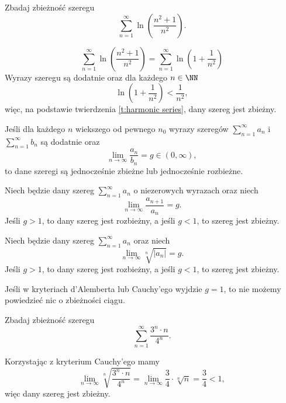 \begin{example}
    Zbadaj zbieżność szeregu
    \[ \sum_{n=1}^\infty \ln\left(\frac{n^2 + 1}{n^2}\right). \]
\end{example}
\begin{solution}
    \[ \sum_{n=1}^\infty \ln\left(\frac{n^2 + 1}{n^2}\right) = \sum_{n=1}^\infty \ln\left(1 + \frac{1}{n^2}\right) \]
    Wyrazy szeregu są dodatnie oraz dla każdego $n \in \NN$
    \[ \ln\left(1 + \frac{1}{n^2}\right)  < \frac{1}{n^2}, \]
    więc, na podstawie twierdzenia \ref{t:harmonic series}, dany szereg jest zbieżny.
\end{solution}

\begin{theorem}
    Jeśli dla każdego $n$ wiekszego od pewnego $n_0$ wyrazy szeregów $\sum_{n=1}^\infty a_n$ i $\sum_{n=1}^\infty b_n$ są dodatnie oraz
    \[ \lim_{n\to\infty} \frac{a_n}{b_n} = g \in (0, \infty), \]
    to dane szeregi są jednocześnie zbieżne lub jednocześnie rozbieżne.
\end{theorem}

\begin{theorem}
    Niech będzie dany szereg $\sum_{n=1}^\infty a_n$ o niezerowych wyrazach oraz niech
    \[ \lim_{n\to\infty} \frac{a_{n+1}}{a_n} = g. \]
    Jeśli $g > 1$, to dany szereg jest rozbieżny, a jeśli $g < 1$, to szereg jest zbieżny.
\end{theorem}

\begin{theorem}
    Niech będzie dany szereg $\sum_{n=1}^\infty a_n$ oraz niech
    \[ \lim_{n\to\infty} \sqrt[n]{|a_n|} = g. \]
    Jeśli $g > 1$, to dany szereg jest rozbieżny, a jeśli $g < 1$, to szereg jest zbieżny.
\end{theorem}

\begin{remark*}
    Jeśli w kryteriach d'Alemberta lub Cauchy'ego wyjdzie $g = 1$, to nie możemy powiedzieć nic o zbieżności ciągu.
\end{remark*}

\begin{example}
    Zbadaj zbieżność szeregu
    \[ \sum_{n=1}^\infty \frac{3^n \cdot n}{4^n}. \]
\end{example}
\begin{solution}
    Korzystając z kryterium Cauchy'ego mamy
    \[ \lim_{n\to\infty} \sqrt[n]{\frac{3^n \cdot n}{4^n}} = \lim_{n\to\infty} \frac{3}{4} \cdot \sqrt[n]{n} = \frac{3}{4} < 1, \]
    więc dany szereg jest zbieżny.
\end{solution}

